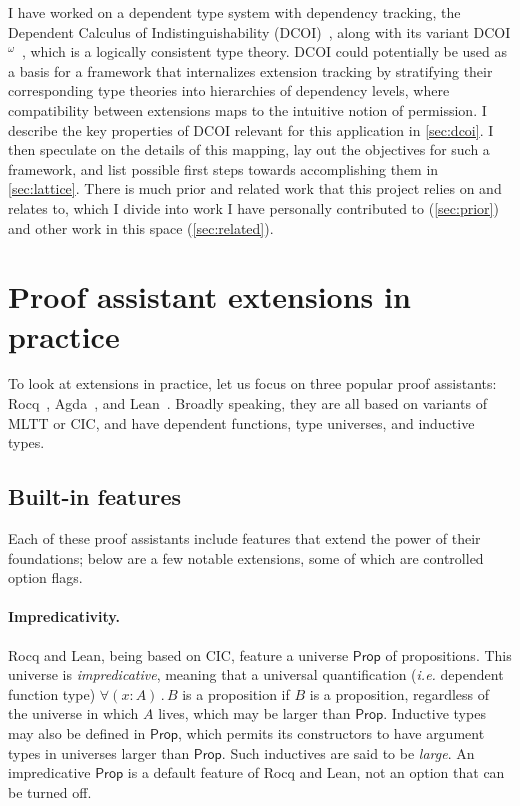 \documentclass{article}
\makeatletter
\newcommand{\ie}{\textit{i.e.}\@\xspace}
\newcommand{\kw}[1]{\mathsf{#1}}
\makeatother
\begin{document}
I have worked on a dependent type system with dependency tracking,
the Dependent Calculus of Indistinguishability (DCOI)~\citep{dcoi},
along with its variant DCOI$^\omega$~\citep{dcoi-omega},
which is a logically consistent type theory.
DCOI could potentially be used as a basis for a framework
that internalizes extension tracking by stratifying
their corresponding type theories into hierarchies of dependency levels,
where compatibility between extensions maps to the intuitive notion of permission.
I describe the key properties of DCOI relevant for this application in \cref{sec:dcoi}.
I then speculate on the details of this mapping,
lay out the objectives for such a framework,
and list possible first steps towards accomplishing them in \cref{sec:lattice}.
There is much prior and related work that this project relies on and relates to,
which I divide into work I have personally contributed to (\cref{sec:prior})
and other work in this space (\cref{sec:related}).

\section{Proof assistant extensions in practice} \label{sec:extensions}

To look at extensions in practice,
let us focus on three popular proof assistants:
Rocq~\citep{coq}, Agda~\citep{agda}, and Lean~\citep{lean}.
Broadly speaking, they are all based on variants of MLTT or CIC,
and have dependent functions, type universes, and inductive types.

\subsection{Built-in features}

Each of these proof assistants include features that extend the power of their foundations;
below are a few notable extensions,
some of which are controlled option flags.

\paragraph{Impredicativity.}
Rocq and Lean, being based on CIC,
feature a universe $\kw{Prop}$ of propositions.
This universe is \emph{impredicative},
meaning that a universal quantification (\ie dependent function type)
$\forall (x : A) \mathpunct{.} B$ is a proposition if $B$ is a proposition,
regardless of the universe in which $A$ lives,
which may be larger than $\kw{Prop}$.
Inductive types may also be defined in $\kw{Prop}$,
which permits its constructors to have argument types
in universes larger than $\kw{Prop}$.
Such inductives are said to be \emph{large}.
An impredicative $\kw{Prop}$ is a default feature of Rocq and Lean,
not an option that can be turned off.
\end{document}
